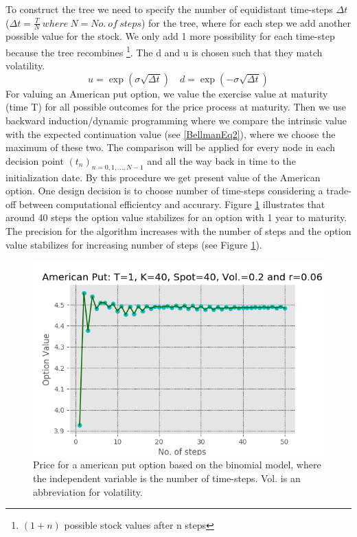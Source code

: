 To construct the tree we need to specify the number of equidistant time-steps $\Delta t$ ($\Delta t = \frac{T}{N} \ where \ N=No. \ of  \ steps$) for the tree, where for each step we add another possible value for the stock. We only add 1 more possibility for each time-step because the tree recombines \footnote{$(1+n)$ possible stock values after n steps}. The d and u is chosen such that they match volatility.
$$u= \exp(\sigma \sqrt{\Delta t}) \quad d= \exp(-\sigma \sqrt{\Delta t})$$
For valuing an American put option, we value the exercise value at maturity (time T) for all possible outcomes for the price process at maturity. Then we use backward induction/dynamic programming where we compare the intrinsic value with the expected continuation value (see \eqref{BellmanEq2}), where we choose the maximum of these two. The comparison will be applied for every node in each decision point $(t_{n})_{n=0,1,\ldots,N-1}$ and all the way back in time to the initialization date. By this procedure we get present value of the American option. One design decision is to choose number of time-steps considering a trade-off between computational efficientcy and accurary. Figure \ref{fig:binConv} illustrates that around 40 steps the option value stabilizes for an option with 1 year to maturity. The precision for the algorithm increases with the number of steps and the option value stabilizes for increasing number of steps (see Figure \ref{fig:binConv}).\\

\begin{figure}[th]
\centering
\includegraphics{Figures/binConv.png}
\decoRule
\caption[Convergence Of Binomial Model]{Price for a american put option based on the binomial model, where the independent variable is the number of time-steps. Vol. is an abbreviation for volatility.}
\label{fig:binConv}
\end{figure}

